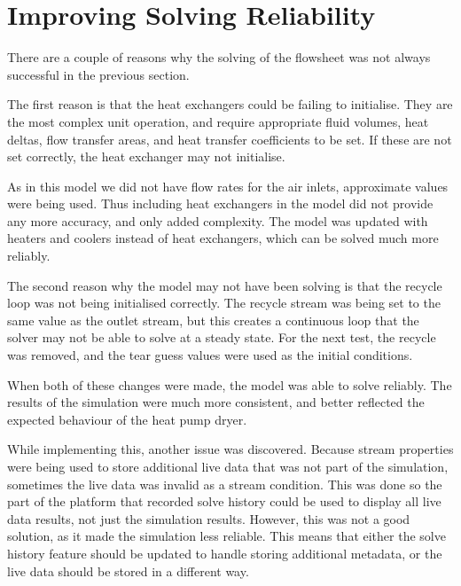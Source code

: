 
\chapter{Improving Solving Reliability} \label{sec:solvingreliability}


There are a couple of reasons why the solving of the flowsheet was not always successful in the previous section. 

The first reason is that the heat exchangers could be failing to initialise. They are the most complex unit operation, and require appropriate fluid volumes, heat deltas, flow transfer areas, and heat transfer coefficients to be set. If these are not set correctly, the heat exchanger may not initialise. 

As in this model we did not have flow rates for the air inlets, approximate values were being used. Thus including heat exchangers in the model did not provide any more accuracy, and only added complexity. The model was updated with heaters and coolers instead of heat exchangers, which can be solved much more reliably.

The second reason why the model may not have been solving is that the recycle loop was not being initialised correctly. The recycle stream was being set to the same value as the outlet stream, but this creates a continuous loop that the solver may not be able to solve at a steady state. For the next test, the recycle was removed, and the tear guess values were used as the initial conditions. 


When both of these changes were made, the model was able to solve reliably. The results of the simulation were much more consistent, and better reflected the expected behaviour of the heat pump dryer.


While implementing this, another issue was discovered. Because stream properties were being used to store additional live data that was not part of the simulation, sometimes the live data was invalid as a stream condition. This was done so the part of the platform that recorded solve history could be used to display all live data results, not just the simulation results. However, this was not a good solution, as it made the simulation less reliable. This means that either the solve history feature should be updated to handle storing additional metadata, or the live data should be stored in a different way.







